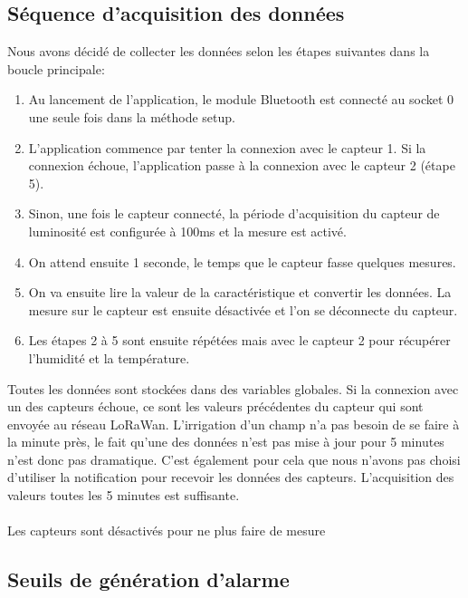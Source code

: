 \subsection{Séquence d'acquisition des données}
Nous avons décidé de collecter les données selon les étapes suivantes dans la boucle principale:
\begin{enumerate}
\item Au lancement de l'application, le module Bluetooth est connecté au socket 0 une seule fois dans la méthode setup.
\item L'application commence par tenter la connexion avec le capteur 1. Si la connexion échoue, l'application passe à la connexion avec le capteur 2 (étape 5).
\item Sinon, une fois le capteur connecté, la période d'acquisition du capteur de luminosité est configurée à 100ms et la mesure est activé. 
\item On attend ensuite 1 seconde, le temps que le capteur fasse quelques mesures. 
\item On va ensuite lire la valeur de la caractéristique et convertir les données. La mesure sur le capteur est ensuite désactivée et l'on se déconnecte du capteur.
\item Les étapes 2 à 5 sont ensuite répétées mais avec le capteur 2 pour récupérer l'humidité et la température.
\end{enumerate}
Toutes les données sont stockées dans des variables globales. Si la connexion avec un des capteurs échoue, ce sont les valeurs précédentes du capteur qui sont envoyée au réseau LoRaWan. L'irrigation d'un champ n'a pas besoin de se faire à la minute près, le fait qu'une des données n'est pas mise à jour pour 5 minutes n'est donc pas dramatique. C'est également pour cela que nous n'avons pas choisi d'utiliser la notification pour recevoir les données des capteurs. L'acquisition des valeurs toutes les 5 minutes est suffisante.\\\\
Les capteurs sont désactivés pour ne plus faire de mesure 
\subsection{Seuils de génération d'alarme}
